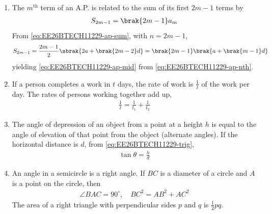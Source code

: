 \begin{enumerate}[label=\thesubsection.\arabic*, ref=\thesubsection.\theenumi]
\item The $m^{\text{th}}$ term of an A.P. is related to the sum of its first $2m-1$ terms by
\begin{align}
	S_{2m-1} = \brak{2m-1}a_m
	\label{eq:EE26BTECH11229-ap-mid}
\end{align}
\solution
From \eqref{eq:EE26BTECH11229-ap-sum}, with $n = 2m-1$,
\begin{align}
	S_{2m-1} = \frac{2m-1}{2}\sbrak{2a + \brak{2m-2}d} = \brak{2m-1}\brak{a + \brak{m-1}d}
\end{align}
yielding \eqref{eq:EE26BTECH11229-ap-mid} from \eqref{eq:EE26BTECH11229-ap-nth}.
\item If a person completes a work in $t$ days, the rate of work is $\frac{1}{t}$ of the work per day. The rates of persons working together add up,
\begin{align}
	\frac{1}{t} = \frac{1}{t_1} + \frac{1}{t_2}
	\label{eq:EE26BTECH11229-work}
\end{align}
\item The angle of depression of an object from a point at a height $h$ is equal to the angle of elevation of that point from the object (alternate angles). If the horizontal distance is $d$, from \eqref{eq:EE26BTECH11229-trig},
\begin{align}
	\tan\theta = \frac{h}{d}
	\label{eq:EE26BTECH11229-depression}
\end{align}
\item An angle in a semicircle is a right angle. If $BC$ is a diameter of a circle and $A$ is a point on the circle, then
\begin{align}
	\angle BAC = 90^{\circ}, \quad BC^2 = AB^2 + AC^2
	\label{eq:EE26BTECH11229-thales}
\end{align}
The area of a right triangle with perpendicular sides $p$ and $q$ is $\frac{1}{2}pq$.
\end{enumerate}
